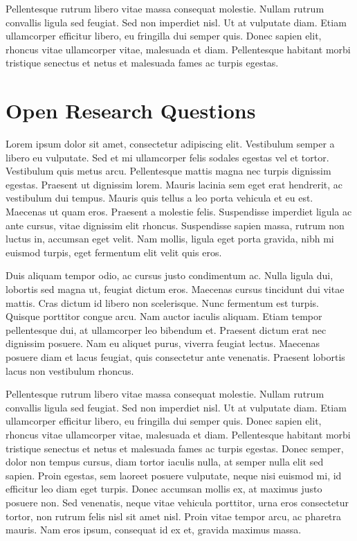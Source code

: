 \documentclass{acm_proc_article-sp}
\begin{document}
Pellentesque rutrum libero vitae massa consequat molestie. Nullam rutrum convallis ligula sed feugiat. Sed non imperdiet nisl. Ut at vulputate diam. Etiam ullamcorper efficitur libero, eu fringilla dui semper quis. Donec sapien elit, rhoncus vitae ullamcorper vitae, malesuada et diam. Pellentesque habitant morbi tristique senectus et netus et malesuada fames ac turpis egestas. 

\section{Open Research Questions}

Lorem ipsum dolor sit amet, consectetur adipiscing elit. Vestibulum semper a libero eu vulputate. Sed et mi ullamcorper felis sodales egestas vel et tortor. Vestibulum quis metus arcu. Pellentesque mattis magna nec turpis dignissim egestas. Praesent ut dignissim lorem. Mauris lacinia sem eget erat hendrerit, ac vestibulum dui tempus. Mauris quis tellus a leo porta vehicula et eu est. Maecenas ut quam eros. Praesent a molestie felis. Suspendisse imperdiet ligula ac ante cursus, vitae dignissim elit rhoncus. Suspendisse sapien massa, rutrum non luctus in, accumsan eget velit. Nam mollis, ligula eget porta gravida, nibh mi euismod turpis, eget fermentum elit velit quis eros.

Duis aliquam tempor odio, ac cursus justo condimentum ac. Nulla ligula dui, lobortis sed magna ut, feugiat dictum eros. Maecenas cursus tincidunt dui vitae mattis. Cras dictum id libero non scelerisque. Nunc fermentum est turpis. Quisque porttitor congue arcu. Nam auctor iaculis aliquam. Etiam tempor pellentesque dui, at ullamcorper leo bibendum et. Praesent dictum erat nec dignissim posuere. Nam eu aliquet purus, viverra feugiat lectus. Maecenas posuere diam et lacus feugiat, quis consectetur ante venenatis. Praesent lobortis lacus non vestibulum rhoncus.

Pellentesque rutrum libero vitae massa consequat molestie. Nullam rutrum convallis ligula sed feugiat. Sed non imperdiet nisl. Ut at vulputate diam. Etiam ullamcorper efficitur libero, eu fringilla dui semper quis. Donec sapien elit, rhoncus vitae ullamcorper vitae, malesuada et diam. Pellentesque habitant morbi tristique senectus et netus et malesuada fames ac turpis egestas. Donec semper, dolor non tempus cursus, diam tortor iaculis nulla, at semper nulla elit sed sapien. Proin egestas, sem laoreet posuere vulputate, neque nisi euismod mi, id efficitur leo diam eget turpis. Donec accumsan mollis ex, at maximus justo posuere non. Sed venenatis, neque vitae vehicula porttitor, urna eros consectetur tortor, non rutrum felis nisl sit amet nisl. Proin vitae tempor arcu, ac pharetra mauris. Nam eros ipsum, consequat id ex et, gravida maximus massa.
\end{document}

